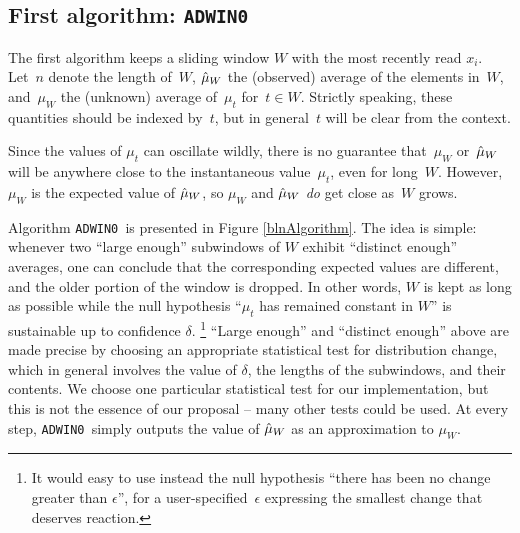 \def\adwinz{{\tt ADWIN0 }}
\def\adwinzz{{\tt ADWIN0}}
\def\adwintwo{{\tt ADWIN }}
\def\adwintwoz{{\tt ADWIN}}
\subsection{First algorithm: \adwinz}
\label{Adwin0}
The first algorithm keeps a sliding window $W$ with the most recently read 
$x_i$. Let~$n$ denote the length of~$W$, 
$\hat{\mu}_W$ the (observed) average of the elements in~$W$, 
and~$\mu_W$ the (unknown) average of~$\mu_t$ for~$t\in W$. 
Strictly speaking, these quantities should be indexed by~$t$, 
but in general~$t$ will be clear from the context. 

Since the values of $\mu_t$ can oscillate wildly, 
there is no guarantee that~$\mu_{W}$ or~$\hat{\mu}_W$ will be anywhere close 
to the instantaneous value~$\mu_t$, even for long~$W$.  
However, $\mu_{W}$ is the expected value of $\hat{\mu}_{W}$, so 
$\mu_{W}$ and $\hat{\mu}_{W}$ {\em do} get close as~$W$ grows. 

Algorithm \adwinz is presented in Figure \ref{blnAlgorithm}. 
The idea is simple: whenever two ``large enough'' 
subwindows of $W$ exhibit ``distinct enough'' averages, 
one can conclude that the corresponding expected values
are different, and the older portion of the window is dropped.
In other words, $W$ is kept as long as possible
while the null hypothesis ``$\mu_t$ has remained
constant in $W$'' is sustainable up to confidence $\delta$.%
\footnote{It would easy to use instead the null hypothesis 
``there has been no change greater than $\epsilon$'', 
for a user-specified~$\epsilon$ expressing the smallest change 
that deserves reaction.}
``Large enough'' and ``distinct enough'' above are made precise
by choosing an appropriate statistical test for distribution change, 
which in general involves 
the value of $\delta$, the lengths of the subwindows, 
and their contents. We choose one particular statistical
test for our implementation, but this is not the essence 
of our proposal -- many other tests could be used. 
At every step, \adwinz simply outputs the value of $\hat{\mu}_W$
as an approximation to $\mu_W$. 

